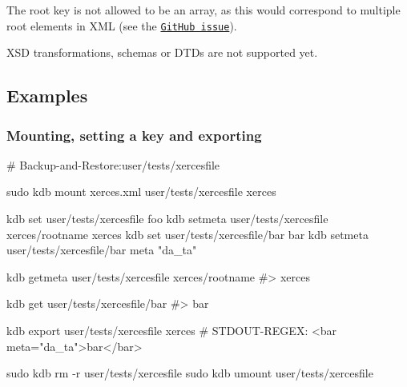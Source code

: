 The root key is not allowed to be an array, as this would correspond to multiple root elements in X\+ML (see the \href{https://github.com/ElektraInitiative/libelektra/issues/1451}{\tt Git\+Hub issue}).

X\+SD transformations, schemas or D\+T\+Ds are not supported yet.

\subsection*{Examples}

\subsubsection*{Mounting, setting a key and exporting}


\begin{DoxyCode}
# Backup-and-Restore:user/tests/xercesfile

sudo kdb mount xerces.xml user/tests/xercesfile xerces

kdb set user/tests/xercesfile foo
kdb setmeta user/tests/xercesfile xerces/rootname xerces
kdb set user/tests/xercesfile/bar bar
kdb setmeta user/tests/xercesfile/bar meta "da\_ta"

kdb getmeta user/tests/xercesfile xerces/rootname
#> xerces

kdb get user/tests/xercesfile/bar
#> bar

kdb export user/tests/xercesfile xerces
# STDOUT-REGEX: <bar meta="da\_ta">bar</bar>

sudo kdb rm -r user/tests/xercesfile
sudo kdb umount user/tests/xercesfile
\end{DoxyCode}
 